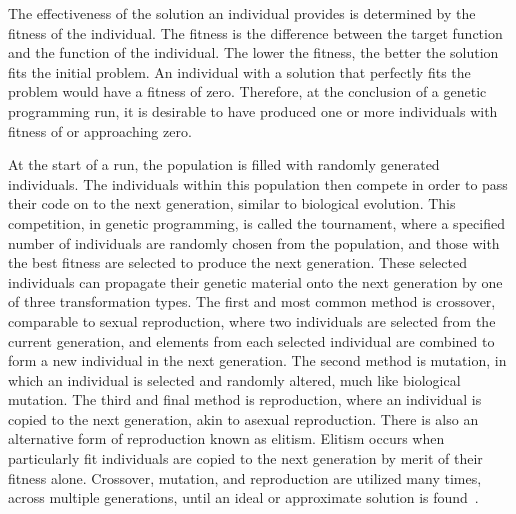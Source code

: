 \documentclass[12pt]{article}
\begin{document}
The effectiveness of the solution an individual provides is determined by the fitness of the individual. The fitness is the difference between the target function and the function of the individual. The lower the fitness, the better the solution fits the initial problem. An individual with a solution that perfectly fits the problem would have a fitness of zero. Therefore, at the conclusion of a genetic programming run, it is desirable to have produced one or more individuals with fitness of or approaching zero.

At the start of a run, the population is filled with randomly generated individuals. The individuals within this population then compete in order to pass their code on to the next generation, similar to biological evolution. This competition, in genetic programming, is called the tournament, where a specified number of individuals are randomly chosen from the population, and those with the best fitness are selected to produce the next generation. These selected individuals can propagate their genetic material onto the next generation by one of three transformation types. The first and most common method is crossover, comparable to sexual reproduction, where two individuals are selected from the current generation, and elements from each selected individual are combined to form a new individual in the next generation. The second method is mutation, in which an individual is selected and randomly altered, much like biological mutation. The third and final method is reproduction, where an individual is copied to the next generation, akin to asexual reproduction. There is also an alternative form of reproduction known as elitism. Elitism occurs when particularly fit individuals are copied to the next generation by merit of their fitness alone. Crossover, mutation, and reproduction are utilized many times, across multiple generations, until an ideal or approximate solution is found~\cite{poli08:fieldguide}.





\end{document}
